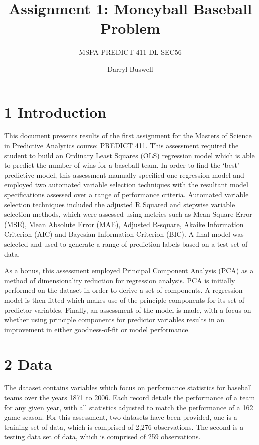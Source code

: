 \documentclass[]{article}
\title{Assignment 1: Moneyball Baseball Problem}
\subtitle{MSPA PREDICT 411-DL-SEC56}
\author{Darryl Buswell}
\date{}
\begin{document}
\maketitle

\section{1 Introduction}\label{introduction}

This document presents results of the first assignment for the Masters
of Science in Predictive Analytics course: PREDICT 411. This assessment
required the student to build an Ordinary Least Squares (OLS) regression
model which is able to predict the number of wins for a baseball team.
In order to find the `best' predictive model, this assessment manually
specified one regression model and employed two automated variable
selection techniques with the resultant model specifications assessed
over a range of performance criteria. Automated variable selection
techniques included the adjusted R Squared and stepwise variable
selection methods, which were assessed using metrics such as Mean Square
Error (MSE), Mean Absolute Error (MAE), Adjusted R-square, Akaike
Information Criterion (AIC) and Bayesian Information Criterion (BIC). A
final model was selected and used to generate a range of prediction
labels based on a test set of data.

As a bonus, this assessment employed Principal Component Analysis (PCA)
as a method of dimensionality reduction for regression analysis. PCA is
initially performed on the dataset in order to derive a set of
components. A regression model is then fitted which makes use of the
principle components for its set of predictor variables. Finally, an
assessment of the model is made, with a focus on whether using principle
components for predictor variables results in an improvement in either
goodness-of-fit or model performance.

\section{2 Data}\label{data}

The dataset contains variables which focus on performance statistics for
baseball teams over the years 1871 to 2006. Each record details the
performance of a team for any given year, with all statistics adjusted
to match the performance of a 162 game season. For this assessment, two
datasets have been provided, one is a training set of data, which is
comprised of 2,276 observations. The second is a testing data set of
data, which is comprised of 259 observations.
\end{document}

